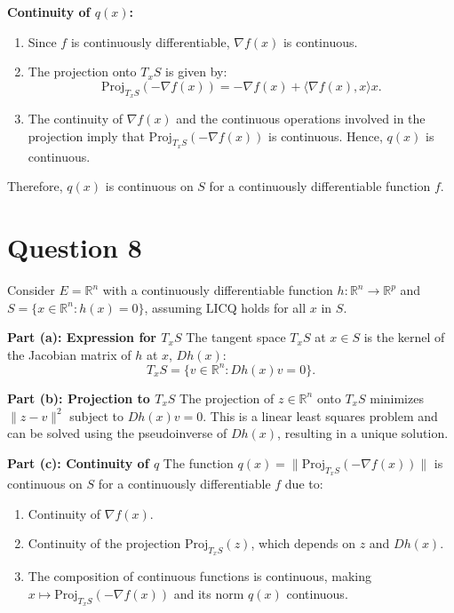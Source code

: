 \documentclass[12p]{article}
\begin{document}
\textbf{Continuity of \( q(x) \):}
\begin{enumerate}
    \item Since \( f \) is continuously differentiable, \( \nabla f(x) \) is continuous.
    \item The projection onto \( T_xS \) is given by:
    \[
    \text{Proj}_{T_xS}(-\nabla f(x)) = -\nabla f(x) + \langle \nabla f(x), x \rangle x.
    \]
    \item The continuity of \( \nabla f(x) \) and the continuous operations involved in the projection imply that \( \text{Proj}_{T_xS}(-\nabla f(x)) \) is continuous. Hence, \( q(x) \) is continuous.
\end{enumerate}

Therefore, \( q(x) \) is continuous on \( S \) for a continuously differentiable function \( f \).

\section*{Question 8} 

Consider \( E = \mathbb{R}^n \) with a continuously differentiable function \( h: \mathbb{R}^n \rightarrow \mathbb{R}^p \) and \( S = \{x \in \mathbb{R}^n : h(x) = 0\} \), assuming LICQ holds for all \( x \) in \( S \).

\textbf{Part (a): Expression for \( T_xS \)}
The tangent space \( T_xS \) at \( x \in S \) is the kernel of the Jacobian matrix of \( h \) at \( x \), \( Dh(x) \):
\[ T_xS = \{ v \in \mathbb{R}^n : Dh(x)v = 0 \}. \]

\textbf{Part (b): Projection to \( T_xS \)}
The projection of \( z \in \mathbb{R}^n \) onto \( T_xS \) minimizes \( \|z - v\|^2 \) subject to \( Dh(x)v = 0 \). This is a linear least squares problem and can be solved using the pseudoinverse of \( Dh(x) \), resulting in a unique solution.

\textbf{Part (c): Continuity of \( q \)}
The function \( q(x) = \| \text{Proj}_{T_xS}(-\nabla f(x)) \| \) is continuous on \( S \) for a continuously differentiable \( f \) due to:
\begin{enumerate}
    \item Continuity of \( \nabla f(x) \).
    \item Continuity of the projection \( \text{Proj}_{T_xS}(z) \), which depends on \( z \) and \( Dh(x) \).
    \item The composition of continuous functions is continuous, making \( x \mapsto \text{Proj}_{T_xS}(-\nabla f(x)) \) and its norm \( q(x) \) continuous.
\end{enumerate} 
\end{document}
